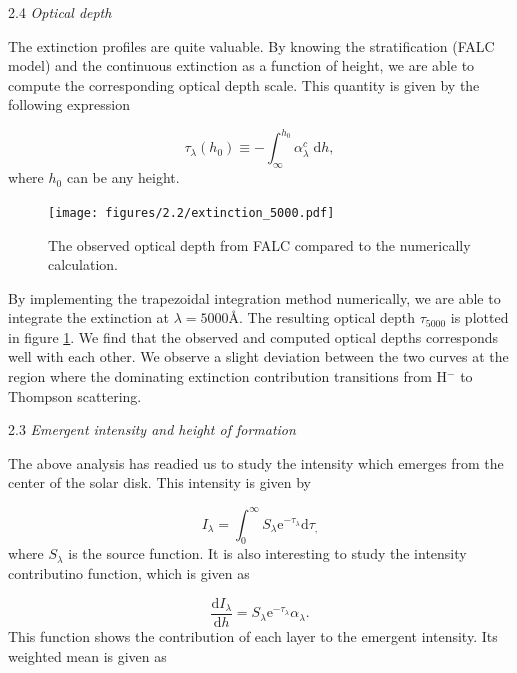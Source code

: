 \documentclass[a4paper,11.5pt,]{article}
\begin{document}
\begin{multicols}{2}
 \begin{center}
2.4 \textit{Optical depth}
\end{center}

The extinction profiles are quite valuable. By knowing the stratification  (FALC model) and the continuous extinction as a function of height, we are able to compute the corresponding optical depth scale. This quantity is given by the following expression

\begin{equation}\label{eq: tau}
    \tau_\lambda(h_0) \equiv - \int^{h_0}_\infty \alpha^c_\lambda \;\mathrm{d}h,
\end{equation}
where $h_0$ can be any height.

\begin{figure}[H]
    \centering
    \texttt{[image: figures/2.2/extinction\_5000.pdf]}
    \caption{The observed optical depth from FALC compared to the numerically calculation. }
    \label{fig : tau5000}
\end{figure}

 By implementing the trapezoidal integration method numerically, we are able to integrate the extinction at $\lambda = 5000 Å$. The resulting optical depth $\tau_{5000}$ is plotted in figure \ref{fig : tau5000}. We find that the observed and computed optical depths corresponds well with each other. We observe a slight deviation between the two curves at the region where the dominating extinction contribution transitions from H$^-$ to Thompson scattering.

 \begin{center}
2.3 \textit{Emergent intensity and height of formation}
\end{center}

The above analysis has readied us to study the intensity which emerges from the center of the solar disk. This intensity is given by

\begin{equation}\label{eq: ilambd}
    I _ { \lambda } = \int _ { 0 } ^ { \infty } S _ { \lambda } \mathrm { e } ^ { - \tau _ { \lambda } } \mathrm { d } \tau _ ,
\end{equation}
where $S_\lambda$ is the source function. It is also interesting to study the intensity contributino function, which is given as

\begin{equation}
\frac { \mathrm { d } I _ { \lambda } } { \mathrm { d } h } = S _ { \lambda } \mathrm { e } ^ { - \tau _ { \lambda } } \alpha _ { \lambda }.
\end{equation}
This function shows the contribution of each layer to the emergent intensity. Its weighted mean is given as


\end{multicols}
\end{document}
